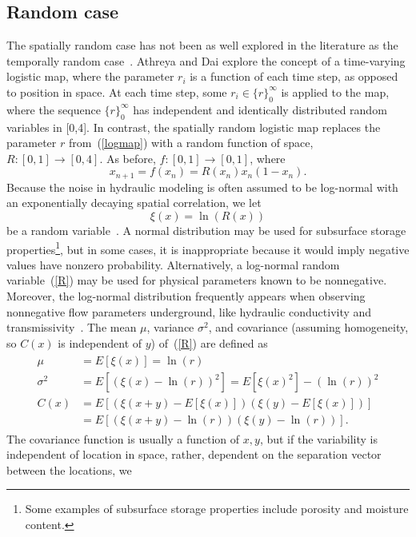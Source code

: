 \subsection{Random case}
The spatially random case has not been as well explored in the
literature as the temporally random case~\cite{athreya}. Athreya and
Dai explore the concept of a time-varying logistic map, where the
parameter $r_i$ is a function of each time step, as opposed to position
in space. At each time step, some $r_i \in \{r\}_0^\infty$ is applied
to the map, where the
sequence $\{r\}_0^\infty$ has independent and identically distributed
random variables in [0,4]. In contrast, the spatially random logistic
map replaces the parameter $r$ from~(\ref{logmap}) with a random
function of space, $R:[0,1]\to [0,4]$. As before, 
$f:[0,1]\to [0,1]$, where
\begin{equation}\label{randlogmap}
x_{n+1} = f(x_n) = R(x_n)x_n(1-x_n).
\end{equation}
Because the noise in hydraulic modeling is often assumed to be log-normal with an
exponentially decaying spatial correlation, we let
\begin{equation}\label{R}
\xi(x)=\ln(R(x)) 
\end{equation}
be a random variable~\cite{gelhar}. A normal distribution may be used
for subsurface storage properties\footnote{Some examples of subsurface
storage properties include porosity and moisture content.}, but in some cases, it is
inappropriate because it would imply negative values have nonzero
probability. Alternatively, a log-normal random variable~(\ref{R}) may
be used for physical parameters known to be nonnegative. Moreover, the log-normal distribution frequently appears when observing
nonnegative flow parameters underground, like hydraulic conductivity and
transmissivity~\cite{gelhar}. The mean $\mu$, variance $\sigma^2$, and
covariance (assuming homogeneity, so $C(x)$ is independent of $y$)
of~(\ref{R}) are defined as
\begin{align}
\begin{split}\label{cor}
\mu&=E[\xi(x)] = \ln(r)\\
\sigma^2&=E[(\xi(x) - \ln(r))^2]=E[\xi(x)^2]-(\ln(r))^2\\
C(x) &=E[(\xi(x+y) - E[\xi(x)])(\xi(y)-E[\xi(x)])] \\
&= E[(\xi(x+y) -\ln(r))(\xi(y)-\ln(r))]. 
\end{split}
\end{align}
The covariance function is usually a function of $x,y$, but if the
variability is independent of location in space, rather, dependent on the separation vector between the locations, we
